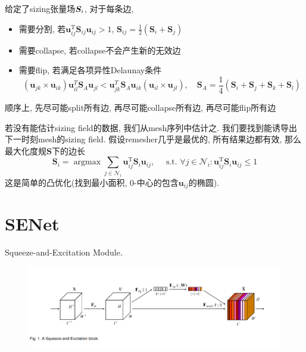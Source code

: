 \documentclass{article}
\begin{document}
给定了sizing张量场$\boldsymbol{S}_i$, 对于每条边, \begin{itemize}
    \item 需要分割, 若$\mathbf{u}_{i j}^{\mathrm{T}} \mathbf{S}_{i j} \mathbf{u}_{i j}>1$, $\mathbf{S}_{i j}=\frac{1}{2}\left(\mathbf{S}_{i}+\mathbf{S}_{j}\right)$
    \item 需要collapse, 若collapse不会产生新的无效边
    \item 需要flip, 若满足各项异性Delaunay条件\begin{equation}
        \left(\mathbf{u}_{j k} \times \mathbf{u}_{i k}\right) \mathbf{u}_{i l}^{T} \mathbf{S}_{A} \mathbf{u}_{j l}<\mathbf{u}_{j k}^{T} \mathbf{S}_{A} \mathbf{u}_{i k}\left(\mathbf{u}_{i l} \times \mathbf{u}_{j l}\right), \quad \mathbf{S}_{A}=\frac{1}{4}\left(\mathbf{S}_{i}+\mathbf{S}_{j}+\mathbf{S}_{k}+\mathbf{S}_{l}\right)
    \end{equation}
\end{itemize}
顺序上, 先尽可能split所有边, 再尽可能collapse所有边, 再尽可能flip所有边

若没有能估计sizing field的数据, 我们从mesh序列中估计之. 我们要找到能诱导出下一时刻mesh的sizing field. 假设remesher几乎是最优的, 所有结果边都有效, 那么最大化度规$\bm S$下的边长
\begin{equation}
    \mathbf{S}_{i}=\operatorname{argmax} \sum_{j \in \mathcal{N}_{i}} \mathbf{u}_{i j}^{\mathrm{T}} \mathbf{S}_{i} \mathbf{u}_{i j}, \quad \text { s.t. } \forall j \in \mathcal{N}_{i}: \mathbf{u}_{i j}^{\mathrm{T}} \mathbf{S}_{i} \mathbf{u}_{i j} \leq 1
\end{equation}
这是简单的凸优化(找到最小面积, 0-中心的包含$\bm u_{ij}$的椭圆).

\section{SENet}
Squeeze-and-Excitation Module.
\begin{figure}[htbp]
    \centering
    \includegraphics[width=\textwidth]{senet.png}
\end{figure}
\end{document}
